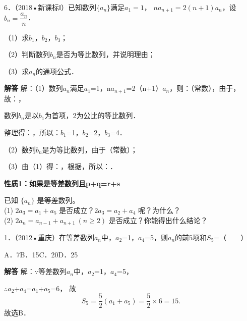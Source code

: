 6．（2018•新课标Ⅰ）已知数列$\{a_n\}$满足$a_1=1$，
$na_{n+1}=2(n+1)a_n$，设$b_n=\dfrac{a_n}{n}$．\par
（1）求\ensuremath{b_{1}}，\ensuremath{b_{2}}，\ensuremath{b_{3}}；\par
（2）判断数列{\ensuremath{b_{n}}}是否为等比数列，并说明理由；\par
（3）求{\ensuremath{a_{n}}}的通项公式．\par
\ifshowanswers
\par\begingroup\color{solutioncolor}\noindent\textbf{解答}\quad
解：（1）数列{\ensuremath{a_{n}}}满足\ensuremath{a_{1}}=1，n\ensuremath{a_{n+1}}=2（n+1）\ensuremath{a_{n}}，则：（常数），由于，故：，\par
数列{\ensuremath{b_{n}}}是以\ensuremath{b_{1}}为首项，2为公比的等比数列．\par
整理得：，所以：\ensuremath{b_{1}}=1，\ensuremath{b_{2}}=2，\ensuremath{b_{3}}=4．\par
（2）数列{\ensuremath{b_{n}}}是为等比数列，由于（常数）；\par
（3）由（1）得：，根据，所以：．\par
\par\endgroup\fi

\par\bigskip{}\par
\par\medskip\noindent\textbf{性质1：如果是等差数列且p+q=r+s}\par
\begin{minipage}{0.94\linewidth}已知 $\{a_n\}$ 是等差数列。\\(1) $2a_3=a_1+a_5$ 是否成立？$2a_3=a_2+a_4$ 呢？为什么？\\(2) $2a_n=a_{n-1}+a_{n+1}\ (n\geq2)$ 是否成立？你能得出什么结论？\end{minipage}\par
{}
1．（2012•重庆）在等差数列{\ensuremath{a_{n}}}中，\ensuremath{a_{2}}=1，\ensuremath{a_{4}}=5，则{\ensuremath{a_{n}}}的前5项和\ensuremath{S_{5}}=（　　）\par
\qquad{}\qquad{}\qquad{}A．7\qquad{}B．15\qquad{}C．20\qquad{}D．25\qquad{}\par
\QuestionSpace{1.2cm}
\ifshowanswers
\par\begingroup\color{solutioncolor}\noindent\textbf{解答}\quad
解：\ensuremath{\because}等差数列{\ensuremath{a_{n}}}中，\ensuremath{a_{2}}=1，\ensuremath{a_{4}}=5，\par
\ensuremath{\therefore}\ensuremath{a_{2}}+\ensuremath{a_{4}}=\ensuremath{a_{1}}+\ensuremath{a_{5}}=6，
故
\[
S_5=\frac52(a_1+a_5)=\frac52\times6=15.
\]
故选B．\par
\par\endgroup\fi

